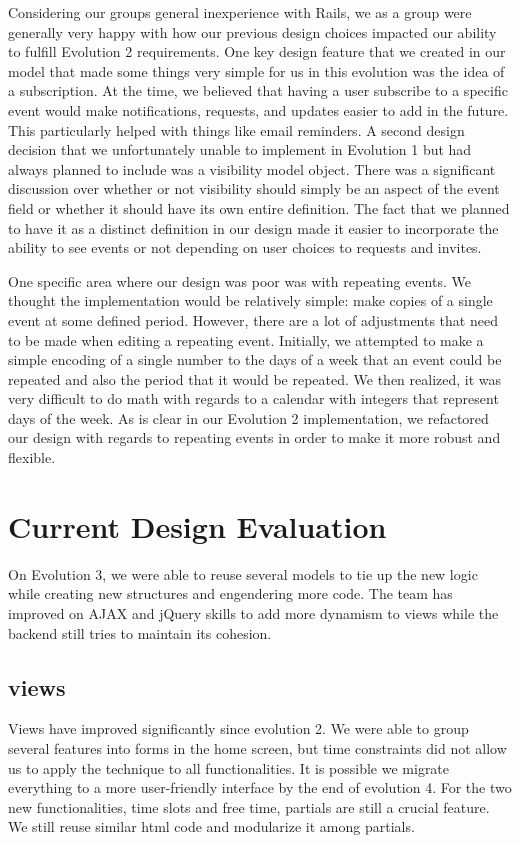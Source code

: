 \documentclass[11pt]{article}
\begin{document}
Considering our groups general inexperience with Rails, we as a group were generally very happy with how our previous design choices impacted our ability to fulfill Evolution 2 requirements.  One key design feature that we created in our model that made some things very simple for us in this evolution was the idea of a subscription.  At the time, we believed that having a user subscribe to a specific event would make notifications, requests, and updates easier to add in the future.  This particularly helped with things like email reminders.  A second design decision that we unfortunately unable to implement in Evolution 1 but had always planned to include was a visibility model object.  There was a significant discussion over whether or not visibility should simply be an aspect of the event field or whether it should have its own entire definition.  The fact that we planned to have it as a distinct definition in our design made it easier to incorporate the ability to see events or not depending on user choices to requests and invites.

One specific area where our design was poor was with repeating events.  We thought the implementation would be relatively simple: make copies of a single event at some defined period.  However, there are a lot of adjustments that need to be made when editing a repeating event.  Initially, we attempted to make a simple encoding of a single number to the days of a week that an event could be repeated and also the period that it would be repeated.  We then realized, it was very difficult to do math with regards to a calendar with integers that represent days of the week.  As is clear in our Evolution 2 implementation, we refactored our design with regards to repeating events in order to make it more robust and flexible.

\section{Current Design Evaluation}
On Evolution 3, we were able to reuse several models to tie up the new logic while creating new structures and engendering more code. The team has improved on AJAX and jQuery skills to add more dynamism to views while the backend still tries to maintain its cohesion.

\subsection{views}
Views have improved significantly since evolution 2. We were able to group several features into forms in the home screen, but time constraints did not allow us to apply the technique to all functionalities. It is possible we migrate everything to a more user-friendly interface by the end of evolution 4. For the two new functionalities, time slots and free time, partials are still a crucial feature. We still reuse similar html code and modularize it among partials.
\end{document}
